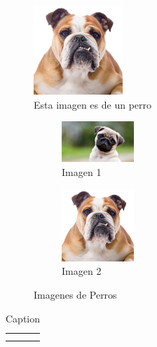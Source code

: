 \documentclass{article}
\begin{document}
\begin{figure}[h!]
    \centering
    \includegraphics[width = 0.3\textwidth]{Perro2.jpg}
    \caption{Esta imagen es de un perro}
    \label{perro2}
\end{figure}

\begin{figure}
    \begin{subfigure}{0.5\textwidth}
         \centering
         \includegraphics[width = 0.3\textwidth]{Perro.jpg}
         \caption{Imagen 1}
         \label{fig:enter-label}
    \end{subfigure}
    \hfill
    \begin{subfigure}{0.5\textwidth}
         \centering
         \includegraphics[width = 0.3\textwidth]{Perro2.jpg}
         \caption{Imagen 2}
         \label{fig:enter-label}
    \end{subfigure}
    
    \caption{Imagenes de Perros}
    \label{fig:enter-label}
\end{figure}

\begin{table}[h!]
    \centering
    \begin{tabular}{c|c}
         &  \\
         & 
    \end{tabular}
    \caption{Caption}
    \label{tab:my_label}
\end{table}
\end{document}
